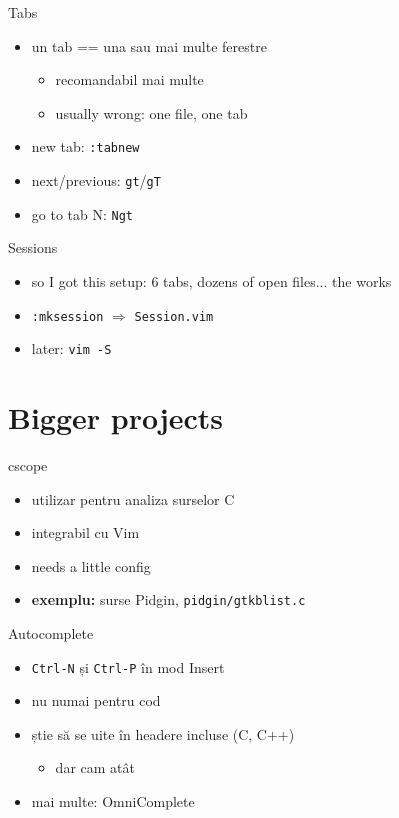 \documentclass{beamer}
\begin{document}
\begin{frame}{Tabs}
  \begin{itemize}
    \item un tab == una sau mai multe ferestre
    \pause
    \begin{itemize}
      \item recomandabil mai multe
      \item usually wrong: one file, one tab
    \end{itemize}
    \pause
    \item new tab: \texttt{:tabnew}
    \item next/previous: \texttt{gt}/\texttt{gT}
    \item go to tab N: \texttt{Ngt}
  \end{itemize}
\end{frame}

\begin{frame}{Sessions}
  \begin{itemize}
    \item so I got this setup: 6 tabs, dozens of open files... the works
    \item \texttt{:mksession} $\Rightarrow$ \texttt{Session.vim}
    \item later: \texttt{vim -S}
  \end{itemize}
\end{frame}

\section{Bigger projects}
\begin{frame}{cscope}
  \begin{itemize}
    \item utilizar pentru analiza surselor C
    \item integrabil cu Vim
    \item needs a little config
    \pause
    \item \textbf{exemplu:} surse Pidgin, \texttt{pidgin/gtkblist.c}
  \end{itemize}
\end{frame}

\begin{frame}{Autocomplete}
  \begin{itemize}
    \item \texttt{Ctrl-N} și \texttt{Ctrl-P} în mod Insert
    \item nu numai pentru cod
    \item știe să se uite în headere incluse (C, C++)
    \pause
      \begin{itemize}
        \item dar cam atât
      \end{itemize}
    \pause
    \item mai multe: OmniComplete
  \end{itemize}
\end{frame}
\end{document}
